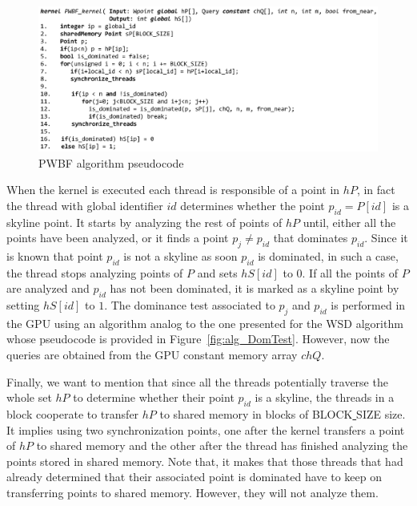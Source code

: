 \documentclass[11pt,onecolumn]{elsart3p}
\begin{document}
        \begin{figure}[]
        \begin{center}
        \includegraphics[width=0.9\linewidth]{img/algorithm_PA.eps}
        \caption{PWBF algorithm pseudocode}\label{fig:alg_paral}
        \end{center}
        \end{figure}


        When the kernel is executed each thread is responsible of a point in $hP$, in fact the thread with global identifier $id$ determines whether the point $p_{id} = P[id]$ is a skyline point. It starts by analyzing the rest of points of $hP$ until, either all the points have been analyzed, or it finds a point $p_j\neq p_{id}$ that dominates $p_{id}$. Since it is known that point $p_{id}$ is not a skyline as soon $p_{id}$ is dominated, in such a case, the thread stops analyzing points of $P$ and sets $hS[id]$ to $0$. If all the points of $P$ are analyzed and $p_{id}$ has not been dominated, it is marked as a skyline point by setting $hS[id]$ to $1$. The dominance test associated to $p_j$ and $p_{id}$ is performed in the GPU using an algorithm analog to the one presented for the WSD algorithm whose pseudocode is provided in Figure~\ref{fig:alg_DomTest}. However, now the queries are obtained from the GPU constant memory array $chQ$.

        Finally, we want to mention that since all the threads potentially traverse the whole set $hP$ to determine whether their point $p_{id}$ is a skyline, the threads in a block cooperate to transfer $hP$ to shared memory in blocks of BLOCK\underline{ }SIZE size. It implies using two synchronization points, one after the kernel transfers a point of $hP$ to shared memory and the other after the thread has finished analyzing the points stored in shared memory. Note that, it makes that those threads that had already determined that their associated point is dominated have to keep on transferring points to shared memory. However, they will not analyze them.
\end{document}
